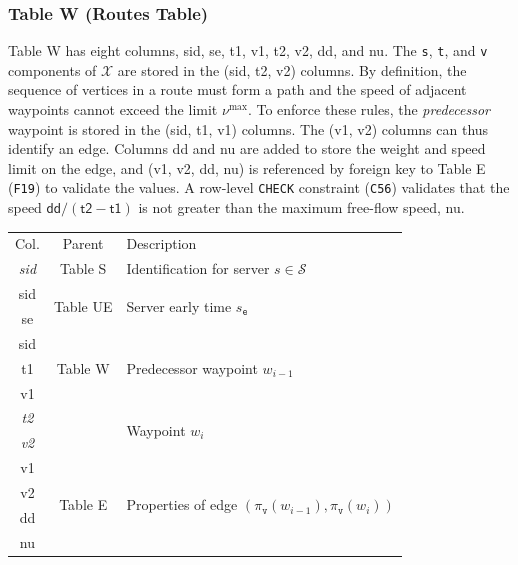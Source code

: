 \documentclass{article}
\theoremstyle{definition}                   %
\begin{document}
\subsubsection{Table W (Routes Table)}
Table W has eight columns, \textsf{sid}, \textsf{se}, \textsf{t1}, \textsf{v1},
\textsf{t2}, \textsf{v2}, \textsf{dd}, and \textsf{nu}.  The \texttt{s},
\texttt{t}, and \texttt{v} components of $\mathcal{X}$ are stored in the
(\textsf{sid}, \textsf{t2}, \textsf{v2}) columns.  By definition, the sequence
of vertices in a route must form a path and the speed of adjacent waypoints
cannot exceed the limit $\nu^\textrm{max}$.  To enforce these rules, the
\emph{predecessor} waypoint is stored in the (\textsf{sid}, \textsf{t1},
\textsf{v1}) columns.  The (\textsf{v1}, \textsf{v2}) columns can thus identify
an edge. Columns \textsf{dd} and \textsf{nu} are added to store the weight and
speed limit on the edge, and (\textsf{v1}, \textsf{v2}, \textsf{dd},
\textsf{nu}) is referenced by foreign key to Table E ({\tt{}F19}) to validate the
values. A row-level \texttt{CHECK} constraint ({\tt{}C56}) validates that the
speed $\textsf{dd}/(\textsf{t2}-\textsf{t1})$ is not greater than the maximum
free-flow speed, \textsf{nu}.
\begin{table}[h]
\centering
\small
\begin{tabular}{|c|c|l|}
\hline
\rowcolor{TableTitle}
\multicolumn{3}{|c|}{Table W (Routes)} \\
\hline
\rowcolor{TableHeader}
Col. & Parent & Description \\
\hline
\textit{sid} & Table S & Identification for server $s\in\mathcal{S}$ \\
\hline
sid & \multirow{2}{*}{Table UE} & \multirow{2}{*}{Server early time $s_\texttt{e}$} \\
se & & \\
\hline
sid & \multirow{3}{*}{Table W} & \multirow{3}{*}{Predecessor waypoint $w_{i-1}$} \\
t1 & & \\
v1 & & \\
\hline
\textit{t2} & & \multirow{2}{*}{Waypoint $w_i$} \\
\textit{v2} & & \\
\hline
v1 & \multirow{4}{*}{Table E} & \multirow{4}{*}{Properties of edge $(\pi_\texttt{v}(w_{i-1}),\pi_\texttt{v}(w_i))$} \\
v2 & & \\
dd & & \\
nu & & \\
\hline
\end{tabular}
\end{table}
\end{document}
